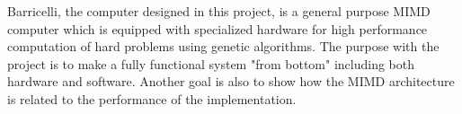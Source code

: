 

Barricelli, the computer designed in this project, is a general purpose MIMD computer which is equipped with specialized hardware for high performance computation of hard problems using genetic algorithms. The purpose
with the project is to make a fully functional system "from bottom" including both hardware and software. Another goal is also to show how the MIMD architecture is related to the performance of the implementation.


